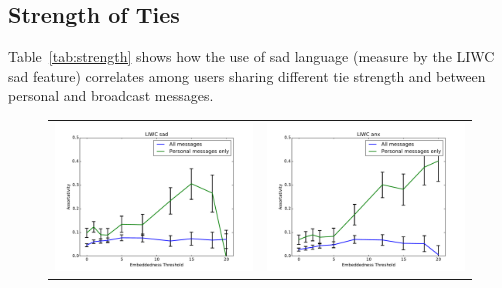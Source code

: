 \documentclass[11pt]{article}
\begin{document}
\subsection{Strength of Ties}
Table~\ref{tab:strength} shows how the use of sad language (measure by the LIWC sad feature) correlates among users sharing different tie strength and between personal and broadcast messages.

\begin{figure}
\centering
\begin{tabular}{cc}
\includegraphics[scale=.2]{sad_corr.pdf} &
\includegraphics[scale=.2]{anx_corr.pdf} \\

\end{tabular}
\end{figure}
\end{document}
